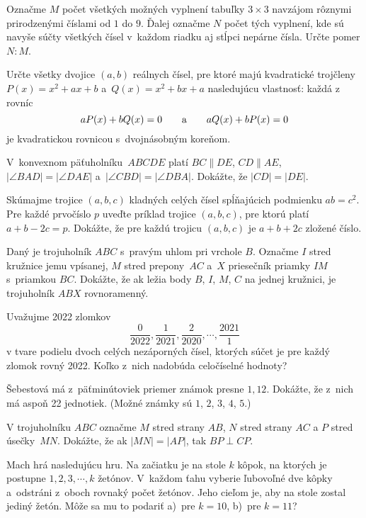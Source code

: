 {%
Označme $M$ počet všetkých možných vyplnení tabuľky $3\times 3$ navzájom rôznymi prirodzenými číslami od $1$ do $9$.
Ďalej označme $N$ počet tých vyplnení, kde sú navyše súčty všetkých čísel v~každom riadku aj stĺpci nepárne čísla. Určte pomer $N:M$.
}

{%
Určte všetky dvojice $(a,b)$ reálnych čísel, pre ktoré majú
kvadratické trojčleny $P(x)=x^2+ax+b$ a~$Q(x)=x^2+bx+a$ nasledujúcu vlastnosť:
každá z rovníc
$$aP(x)+bQ(x)=0 \qquad \hbox{a} \qquad aQ(x)+bP(x)=0$$
je kvadratickou rovnicou s~dvojnásobným koreňom.
}

{%
V~konvexnom päťuholníku~$ABCDE$ platí $BC \parallel DE$, $CD \parallel AE$, $|\angle BAD|=|\angle DAE|$ a~$|\angle CBD|=|\angle DBA|$. Dokážte, že $|CD|=|DE|$.}

{%
Skúmajme trojice $(a,b,c)$ kladných celých čísel spĺňajúcich podmienku $ab=c^2$.
 Pre každé prvočíslo $p$ uveďte príklad trojice $(a,b,c)$, pre ktorú platí $a+b-2c=p$.
 Dokážte, že pre každú trojicu $(a,b,c)$ je $a+b+2c$ zložené číslo.
}

{%
Daný je trojuholník $ABC$ s~pravým uhlom pri vrchole $B$. Označme $I$ stred kružnice jemu vpísanej, $M$ stred prepony~$AC$ a~$X$ priesečník priamky $IM$ s~priamkou $BC$. Dokážte, že ak ležia body $B$, $I$, $M$, $C$ na jednej kružnici, je trojuholník $ABX$ rovnoramenný.
}

{%
Uvažujme 2022 zlomkov
$$\frac{0}{2022},\frac{1}{2021},\frac{2}{2020},\cdots,\frac{2021}{1}$$
v tvare podielu dvoch celých nezáporných čísel, ktorých súčet je pre každý zlomok rovný 2022. Koľko z~nich nadobúda celočíselné hodnoty?
}

{%
Šebestová má z~päťminútoviek priemer známok presne $1{,}12$. Dokážte, že z~nich má aspoň 22 jednotiek.
(Možné známky sú $1$, $2$, $3$, $4$, $5$.)}

{%
V trojuholníku $ABC$ označme $M$ stred strany $AB$, $N$ stred strany $AC$ a $P$ stred úsečky~$MN$. Dokážte, že ak $|MN|=|AP|$, tak $BP \perp CP$.}

{%
Mach hrá nasledujúcu hru. Na začiatku je na stole $k$ kôpok, na ktorých je postupne $1, 2, 3, \cdots, k$ žetónov. V~každom ťahu vyberie ľubovoľné dve kôpky a~odstráni z~oboch rovnaký počet žetónov. Jeho cieľom je, aby na stole zostal jediný žetón. Môže sa mu to podariť a)~pre $k=10$, b)~pre $k=11$?}

